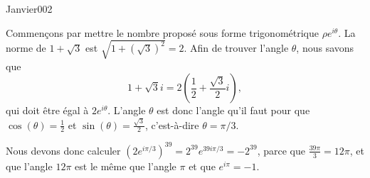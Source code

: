\begin{corrige}{Janvier002}


Commençons par mettre le nombre proposé sous forme trigonométrique $\rho e^{i\theta}$. La norme de $1+\sqrt{3}$ est $\sqrt{1+(\sqrt{3})^2}=2$. Afin de trouver l'angle $\theta$, nous savons que
\begin{equation}
	1+\sqrt{3}i=2(\frac{ 1 }{2}+\frac{ \sqrt{3} }{ 2 }i),
\end{equation}
qui doit être égal à $2 e^{i\theta}$. L'angle $\theta$ est donc l'angle qu'il faut pour que $\cos(\theta)=\frac{1}{ 2 }$ et $\sin(\theta)=\frac{ \sqrt{3} }{ 2 }$, c'est-à-dire $\theta=\pi/3$.

Nous devons donc calculer $\left( 2 e^{i\pi/3} \right)^{39}=2^{39} e^{39i\pi/3}=-2^{39}$, parce que $\frac{ 39\pi }{ 3 }=12\pi$, et que l'angle $12\pi$ est le même que l'angle $\pi$ et que $ e^{i\pi}=-1$.

\end{corrige}
